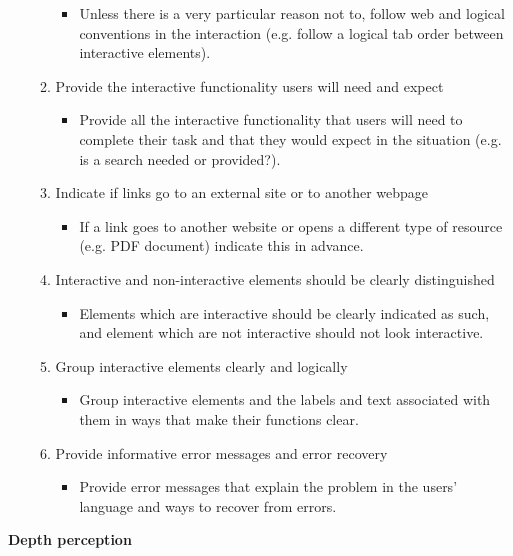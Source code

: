 \begin{itemize}
\begin{enumerate}[resume]
\begin{itemize}
			\item Unless there is a very particular reason not to, follow web and logical conventions in the interaction (e.g. follow a logical tab order between interactive elements).
		\end{itemize}
		\item Provide the interactive functionality users will need and expect
		\begin{itemize}
			\item Provide all the interactive functionality that users will need to complete their task and that they would expect in the situation (e.g. is a search needed or provided?).
		\end{itemize}
		\item Indicate if links go to an external site or to another webpage
		\begin{itemize}
			\item If a link goes to another website or opens a different type of resource (e.g. PDF document) indicate this in advance.
		\end{itemize}
		\item Interactive and non-interactive elements should be clearly distinguished
		\begin{itemize}
			\item Elements which are interactive should be clearly indicated as such, and element which are not interactive should not look interactive.
		\end{itemize}
		\item Group interactive elements clearly and logically
		\begin{itemize}
			\item Group interactive elements and the labels and text associated with them in ways that make their functions clear.
		\end{itemize}
		\item Provide informative error messages and error recovery
		\begin{itemize}
			\item Provide error messages that explain the problem in the users' language and ways to recover from errors.
		\end{itemize}
	\end{enumerate}
\end{itemize}
\textbf{Depth perception}
